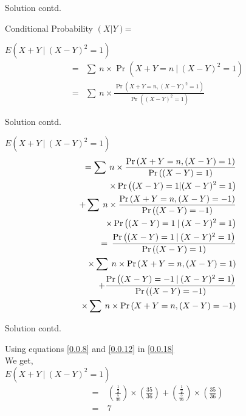 \documentclass{beamer}
\providecommand{\brak}[1]{\ensuremath{\left(#1\right)}}
\begin{document}
\begin{frame}{Solution contd.}
    \begin{block}{Conditional Probability}
        \Pr\brak{X|Y}=\frac{\Pr\brak{X,Y}}{\Pr\brak{Y}}
        \end{block}
    \begin{block}{}
        $E\brak{X+Y\:|\:(X-Y)^2=1}$
        \begin{align}
            =&\sum\:n\times\Pr\brak{X+Y=n\:|\:(X-Y)^2=1}\\
            =&\sum\:n\times\frac{\Pr\brak{X+Y=n,(X-Y)^2=1}}{\Pr\brak{(X-Y)^2=1}}
        \end{align}
    \end{block}
\end{frame}
\begin{frame}{Solution contd.}
    \begin{block}{}
        $E\brak{X+Y\:|\:(X-Y)^2=1}$
        \begin{align}
            \begin{split}
                =\sum\:n\times\frac{\Pr\brak{X+Y=n,(X-Y)=1}}{\Pr\brak{(X-Y)=1}}
                \bigskip\\
                \times\Pr\brak{(X-Y)=1|(X-Y)^2=1}
                \bigskip\\
                +\sum\:n\times\frac{\Pr\brak{X+Y=n,(X-Y)=-1}}{\Pr\brak{(X-Y)=-1}}
                \bigskip\\
                \times\Pr\brak{(X-Y)=1\:|\:(X-Y)^2=1}
                \end{split}
                \\
                \begin{split}
                =\:\frac{\Pr\brak{(X-Y)=1\:|\:(X-Y)^2=1}}{\Pr\brak{(X-Y)=1}}
                \bigskip\\
                \times\sum\:n\times\Pr\brak{X+Y=n,(X-Y)=1}
                \bigskip\\
                +\frac{\Pr\brak{(X-Y)=-1\:|\:(X-Y)^2=1}}{\Pr\brak{(X-Y)=-1}}
                \bigskip\\
                \times\sum\:n\times\Pr\brak{X+Y=n,(X-Y)=-1}\label{0.0.18}
            \end{split}
        \end{align}
    \end{block}
\end{frame}
\begin{frame}{Solution contd.}
    \begin{block}{}
        Using equations \eqref{0.0.8} and \eqref{0.0.12} in \eqref{0.0.18}\\
        We get,\\
        \newline
        $E\brak{X+Y\:|\:(X-Y)^2=1}$
        \begin{align}
            =&\:\brak{\frac{\frac{1}{2}}{\frac{5}{36}}}\times\brak{\frac{35}{36}}+\brak{\frac{\frac{1}{2}}{\frac{5}{36}}}\times\brak{\frac{35}{36}}\\
            =&\:7
        \end{align}
    \end{block}
\end{frame}
\end{document}
